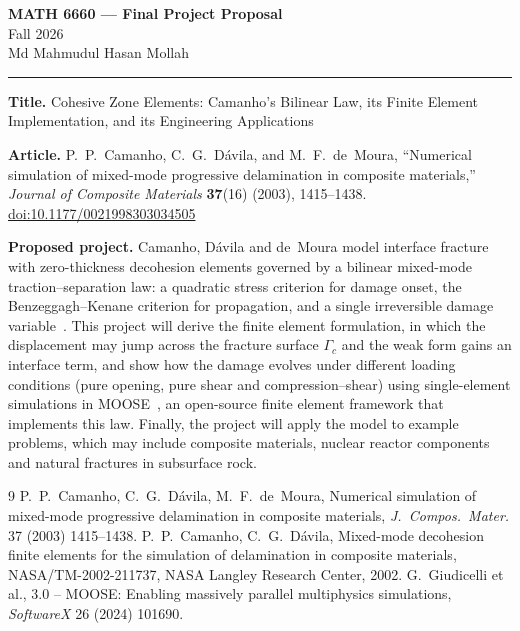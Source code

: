 \documentclass[12pt]{article}
\begin{document}
\thispagestyle{empty}

\begin{center}
  {\large\bfseries MATH 6660 --- Final Project Proposal}\\[2pt]
  {\small Fall 2026}\\[8pt]
  Md Mahmudul Hasan Mollah\\
\end{center}

\vspace{4pt}
\hrule
\vspace{10pt}

\textbf{Title.}
Cohesive Zone Elements: Camanho's Bilinear Law,
its Finite Element Implementation, and its Engineering Applications

\textbf{Article.}
P.~P.~Camanho, C.~G.~D\'avila, and M.~F.~de~Moura,
``Numerical simulation of mixed-mode progressive delamination in composite
materials,'' \emph{Journal of Composite Materials} \textbf{37}(16) (2003),
1415--1438. \href{https://doi.org/10.1177/0021998303034505}{doi:10.1177/0021998303034505}

\textbf{Proposed project.}
Camanho, D\'avila and de~Moura model interface fracture with zero-thickness
decohesion elements governed by a bilinear mixed-mode traction--separation
law: a quadratic stress criterion for damage onset, the Benzeggagh--Kenane
criterion for propagation, and a single irreversible damage
variable~\cite{camanho2003,camanho2002}.
This project will derive the finite element formulation, in which the
displacement may jump across the fracture surface $\Gamma_c$ and the weak form
gains an interface term, and show how the damage evolves under different
loading conditions (pure opening, pure shear and compression--shear) using
single-element simulations in MOOSE~\cite{moose}, an open-source finite element
framework that implements this law. Finally, the project will apply the model to example problems, which may include composite materials, nuclear reactor components and natural fractures in subsurface rock.\\

\vspace{4pt}
\begingroup
\small
\renewcommand{\section}[2]{\textbf{References}\par\vspace{-2pt}}
\begin{thebibliography}{9}
  \setlength{\itemsep}{1pt}
    P.~P.~Camanho, C.~G.~D\'avila, M.~F.~de~Moura,
    Numerical simulation of mixed-mode progressive delamination in composite
    materials, \emph{J.\ Compos.\ Mater.} 37 (2003) 1415--1438.
    P.~P.~Camanho, C.~G.~D\'avila,
    Mixed-mode decohesion finite elements for the simulation of delamination
    in composite materials, NASA/TM-2002-211737, NASA Langley Research
    Center, 2002.
    G.~Giudicelli et al., 3.0 -- MOOSE: Enabling massively parallel
    multiphysics simulations, \emph{SoftwareX} 26 (2024) 101690.
\end{thebibliography}
\endgroup
\end{document}
